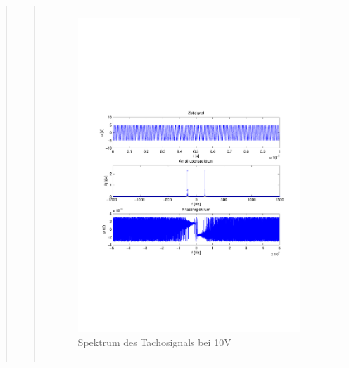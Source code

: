 \begin{quote}
\begin{quote}
        \begin{center}
                \begin{tabular}{ll}
    
                \hspace{-12em}
                    \begin{minipage}{0.6\textwidth}
    
                        \begin{figure}[H]
                            \label{fig:}
                            \includegraphics[scale=0.45, trim = 0.8cm 7cm 3cm
                            8.5cm, clip]{./Bilder/ampl_spektrum_messung1_tacho}
                            \caption{Spektrum des Tachosignals bei 10V}
                        \end{figure}
    

\end{minipage}
\end{tabular}
\end{center}
\end{quote}
\end{quote}
